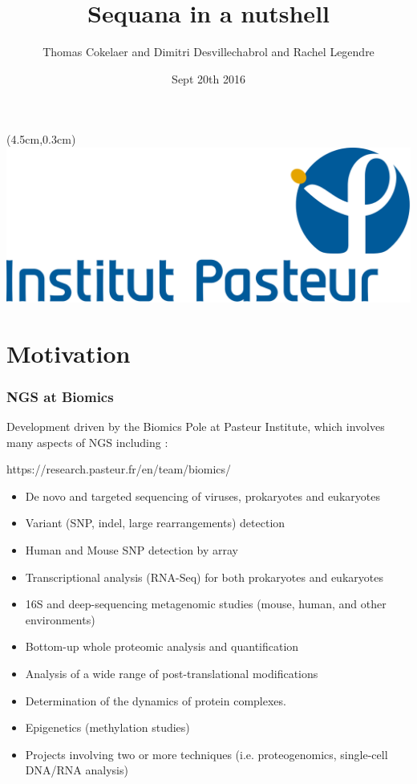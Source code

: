 \documentclass{beamer}
\title{Sequana in a nutshell}
\author[T.Cokelaer \& D.Desvillechabrol]{Thomas Cokelaer and Dimitri Desvillechabrol
and Rachel Legendre}
\institute{Institut Pasteur}
\date{Sept 20th 2016}
\begin{document}

\begin{frame}[plain]
    \titlepage
    \begin{textblock*}{5cm}(4.5cm,0.3cm)
        \includegraphics[scale=0.09]{images/Institut_Pasteur.png}
    \end{textblock*}
\end{frame}


\section{Motivation}

\begin{frame}
 \frametitle{NGS at Biomics}
 
 Development driven by the Biomics Pole at Pasteur Institute, which involves
 many aspects of NGS including :
 
 \tiny
 \begin{block}{https://research.pasteur.fr/en/team/biomics/}
  \begin{itemize}
  \item De novo and targeted sequencing of viruses, prokaryotes and eukaryotes
  \item Variant (SNP, indel, large rearrangements) detection
  \item Human and Mouse SNP detection by array
  \item Transcriptional analysis (RNA-Seq) for both prokaryotes and eukaryotes
  \item 16S and deep-sequencing metagenomic studies (mouse, human, and other environments)
  \item Bottom-up whole proteomic analysis and quantification
  \item Analysis of a wide range of post-translational modifications
  \item Determination of the dynamics of protein complexes.
  \item Epigenetics (methylation studies)
  \item Projects involving two or more techniques (i.e. proteogenomics, single-cell DNA/RNA analysis)
  \end{itemize}
 \end{block}
 \small 
\end{frame}
\end{document}

